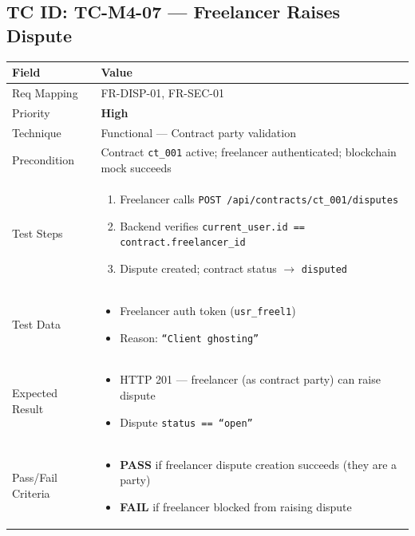 \documentclass[12pt,a4paper]{article}
\newcommand{\sevhigh}{\textcolor{severityhigh}{\textbf{High}}}
\newcommand{\passresult}{\textcolor{passgreen}{\textbf{PASS}}}
\newcommand{\failresult}{\textcolor{failred}{\textbf{FAIL}}}
\begin{document}
\vspace{0.8cm}

\subsection{TC ID: TC-M4-07 --- Freelancer Raises Dispute}

\begin{tabular}{|p{}|p{}|}
\hline
\rowcolor{lightblue} \textbf{Field} & \textbf{Value} \\
\hline
Req Mapping & FR-DISP-01, FR-SEC-01 \\
\hline
Priority & \sevhigh \\
\hline
Technique & Functional --- Contract party validation \\
\hline
Precondition & Contract \texttt{ct\_001} active; freelancer authenticated; blockchain mock succeeds \\
\hline
Test Steps &
\begin{enumerate}[nosep, leftmargin=*]
  \item Freelancer calls \texttt{POST /api/contracts/ct\_001/disputes}
  \item Backend verifies \texttt{current\_user.id == contract.freelancer\_id}
  \item Dispute created; contract status $\rightarrow$ \texttt{disputed}
\end{enumerate} \\
\hline
Test Data &
\begin{itemize}[nosep, leftmargin=*]
  \item Freelancer auth token (\texttt{usr\_freel1})
  \item Reason: \texttt{``Client ghosting''}
\end{itemize} \\
\hline
Expected Result &
\begin{itemize}[nosep, leftmargin=*]
  \item HTTP 201 --- freelancer (as contract party) can raise dispute
  \item Dispute \texttt{status == ``open''}
\end{itemize} \\
\hline
Pass/Fail Criteria &
\begin{itemize}[nosep, leftmargin=*]
  \item \passresult{} if freelancer dispute creation succeeds (they are a party)
  \item \failresult{} if freelancer blocked from raising dispute
\end{itemize} \\
\hline
\end{tabular}
\end{document}
